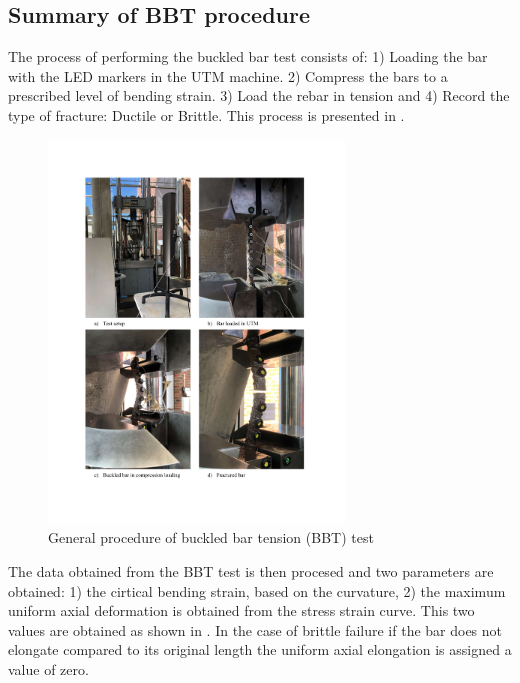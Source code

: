 \subsection{Summary of BBT procedure}

The process of  performing the buckled bar test consists of: 1) Loading the bar with the LED markers in the UTM machine. 2) Compress the bars to a prescribed level of bending strain. 3) Load the rebar in tension and  4) Record the type of fracture: Ductile or Brittle. This process is presented in .

\begin{figure}[htbp]
	\centering
	\includegraphics[width=0.7\textwidth]{VAC Thesis 2.0/Chapter-4/figs/BBT Procedure.pdf}
	\caption{General procedure of buckled bar tension (BBT) test}
	\label{fig:BBT_Test_Summary}
\end{figure}

The data obtained from the BBT test is then procesed and two parameters are obtained: 1) the cirtical bending strain, based on the curvature, 2) the maximum uniform axial deformation is obtained from the stress strain curve. This two values are obtained as shown in . In the case of brittle failure if the bar does not elongate compared to its original length the uniform axial elongation is assigned a value of zero.

